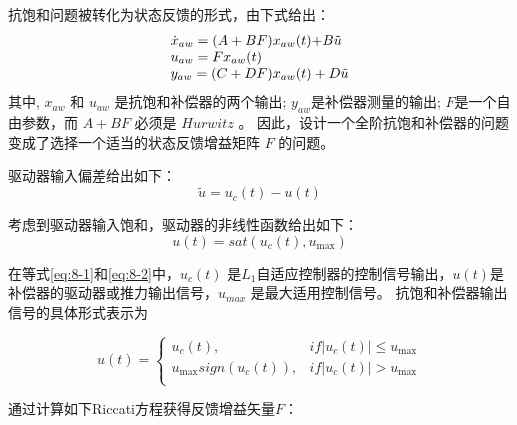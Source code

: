 抗饱和问题被转化为状态反馈的形式，由下式给出：
\begin{equation}
\begin{array}{l}
 {{\dot x}_{aw}} = (A + BF){x_{aw}}(t){\rm{ + }}B\tilde u \\
 {u_{aw}} = F{x_{aw}}(t) \\
 {y_{aw}} = (C + DF){x_{aw}}(t) + D\tilde u \\
\end{array}
\end{equation}
其中, $x_{aw}$ 和 $u_{aw}$ 是抗饱和补偿器的两个输出; $y_{{aw}}$是补偿器测量的输出; $F$是一个自由参数，而 $A+BF$ 必须是 $Hurwitz$ 。 因此，设计一个全阶抗饱和补偿器的问题变成了选择一个适当的状态反馈增益矩阵 $F$ 的问题。

驱动器输入偏差给出如下：
\begin{equation}
\label{eq:8-1}
\tilde u = {u_c}(t) - u(t)
\end{equation}

考虑到驱动器输入饱和，驱动器的非线性函数给出如下：
\begin{equation}
\label{eq:8-2}
u(t) = sat({u_c}(t),{u_{\max }})
\end{equation}

在等式\ref{eq:8-1}和\ref{eq:8-2}中，$u_c(t)$ 是$L_{1}$自适应控制器的控制信号输出，$u(t)$是补偿器的驱动器或推力输出信号，$u_{max}$ 是最大适用控制信号。 抗饱和补偿器输出信号的具体形式表示为

\begin{equation}
u(t) = \left\{ {\begin{array}{*{20}{c}}
   {{u_c}(t),} & {if\left| {{u_c}(t)} \right| \le {u_{\max }}}  \\
   {{u_{\max }}sign({u_c}(t)),} & {if\left| {{u_c}(t)} \right| > {u_{\max }}}  \\
\end{array}} \right.
\end{equation}

通过计算如下Riccati方程获得反馈增益矢量$F$：

